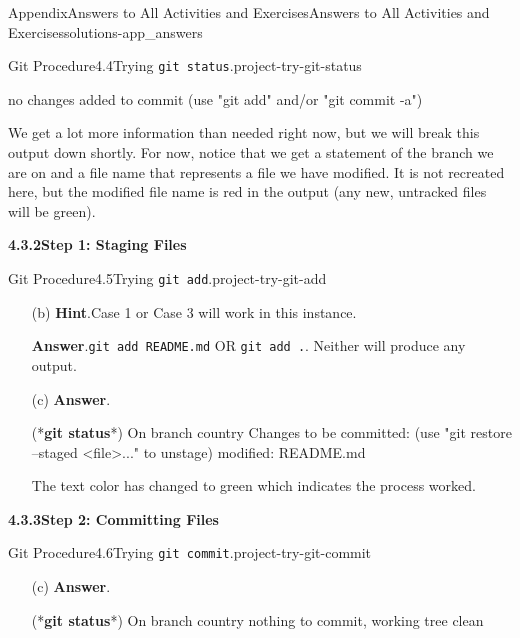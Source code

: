 \documentclass[oneside,10pt,]{book}
\newcommand{\blocktitlefont}{\relax}
\newcommand{\mono}[1]{\texttt{#1}}
\newcommand{\consoleinput}[1]{\textbf{#1}}
\begin{document}
\begin{solutions-chapter}{Appendix}{Answers to All Activities and Exercises}{}{Answers to All Activities and Exercises}{}{}{solutions-app_answers}
\begin{projectsolution}{Git Procedure}{4.4}{Trying \mono{git status}.}{project-try-git-status}
\begin{console}{0}{1}{0}
no changes added to commit (use "git add" and/or "git commit -a")
\end{console}
We get a lot more information than needed right now, but we will break this output down shortly. For now, notice that we get a statement of the branch we are on and a file name that represents a file we have modified. It is not recreated here, but the modified file name is red in the output (any new, untracked files will be green).%
\end{projectsolution}%
\par\medskip
\noindent\textbf{\Large{}4.3.2\space\textperiodcentered\space{}Step 1: Staging Files}
\begin{projectsolution}{Git Procedure}{4.5}{Trying \mono{git add}.}{project-try-git-add}%
\begin{enumerate}[font=\bfseries,label=(\alph*),ref=\alph*]%
\item[(b)]\noindent\textbf{\blocktitlefont Hint}.\hypertarget{hint-try-git-add-d-b-back}{}\quad{}Case 1 or Case 3 will work in this instance.%
\par\smallskip%
\noindent\textbf{\blocktitlefont Answer}.\hypertarget{answer-try-git-add-d-c-back}{}\quad{}\mono{git add README.md} OR \mono{git add .}. Neither will produce any output.%
\item[(c)]\noindent\textbf{\blocktitlefont Answer}.\hypertarget{answer-try-git-add-e-b-back}{}\quad{}\begin{console}{0}{1}{0}
(*\consoleinput{git status}*)
On branch country
Changes to be committed:
  (use "git restore --staged <file>..." to unstage)
        modified:   README.md
\end{console}
The text color has changed to green which indicates the process worked.%
\end{enumerate}%
\end{projectsolution}%
\par\medskip
\noindent\textbf{\Large{}4.3.3\space\textperiodcentered\space{}Step 2: Committing Files}
\begin{projectsolution}{Git Procedure}{4.6}{Trying \mono{git commit}.}{project-try-git-commit}%
\begin{enumerate}[font=\bfseries,label=(\alph*),ref=\alph*]%
\item[(c)]\noindent\textbf{\blocktitlefont Answer}.\hypertarget{answer-try-git-commit-e-b-back}{}\quad{}\begin{console}{0}{1}{0}
(*\consoleinput{git status}*)
On branch country
nothing to commit, working tree clean
\end{console}

\end{enumerate}
\end{projectsolution}
\end{solutions-chapter}
\end{document}
